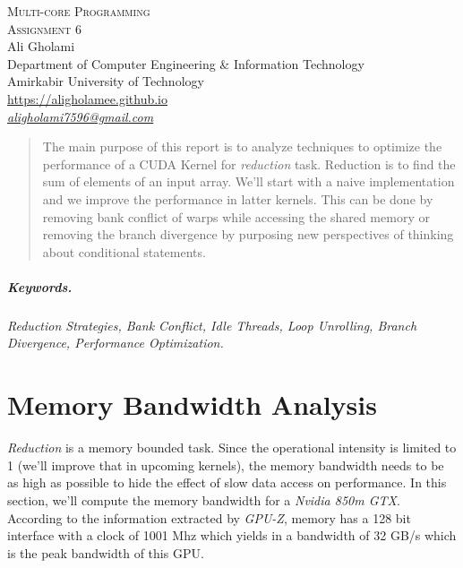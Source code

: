 \documentclass[12pt]{article}
\numberwithin{equation}{section}
\numberwithin{table}{section}
\numberwithin{figure}{section}
\begin{document}

\begin{center}
\textsc{\Huge Multi-core Programming} \\[2pt]
	\textsc{\Large Assignment 6}\\
	\vspace{0.5cm}
  Ali Gholami \\[6pt]
  Department of Computer Engineering \& Information Technology\\
  Amirkabir University of Technology  \\[6pt]
  \def\UrlFont{\em}
  \url{https://aligholamee.github.io}\\
\href{mailto:aligholami7596@gmail.com}{\textit{aligholami7596@gmail.com}}
\end{center}

\begin{abstract}
The main purpose of this report is to analyze techniques to optimize the performance of a CUDA Kernel for \textit{reduction} task. Reduction is to find the sum of elements of an input array. We'll start with a naive implementation and we improve the performance in latter kernels. This can be done by removing bank conflict of warps while accessing the shared memory or removing the branch divergence by purposing new perspectives of thinking about conditional statements.
\end{abstract} 

\subparagraph{Keywords.} \textit{Reduction Strategies, Bank Conflict, Idle Threads, Loop Unrolling, Branch Divergence, Performance Optimization.}

\section{Memory Bandwidth Analysis}
\textit{Reduction} is a memory bounded task. Since the operational intensity is limited to 1 (we'll improve that in upcoming kernels), the memory bandwidth needs to be as high as possible to hide the effect of slow data access on performance. In this section, we'll compute the memory bandwidth for a \textit{Nvidia 850m GTX}. According to the information extracted by \textit{GPU-Z}, memory has a 128 bit interface with a clock of 1001 Mhz which yields in a bandwidth of 32 GB/s which is the peak bandwidth of this GPU.
\end{document}
